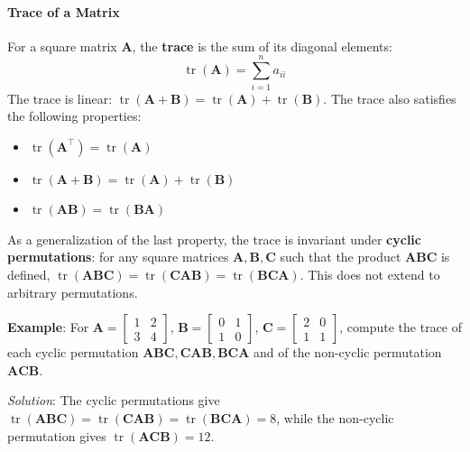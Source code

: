 \paragraph*{Trace of a Matrix}
For a square matrix $ \mathbf{A} $, the \textbf{trace} is the sum of its diagonal elements:
\begin{equation*}
    \operatorname{tr}(\mathbf{A}) = \sum_{i=1}^n a_{ii}
\end{equation*}
The trace is linear: $ \operatorname{tr}(\mathbf{A} + \mathbf{B}) = \operatorname{tr}(\mathbf{A}) + \operatorname{tr}(\mathbf{B}) $.
The trace also satisfies the following properties:
\begin{itemize}
\item $ \operatorname{tr}(\mathbf{A}^\top) = \operatorname{tr}(\mathbf{A}) $
\item $ \operatorname{tr}(\mathbf{A} + \mathbf{B}) = \operatorname{tr}(\mathbf{A}) + \operatorname{tr}(\mathbf{B}) $
\item $ \operatorname{tr}(\mathbf{AB}) = \operatorname{tr}(\mathbf{BA}) $
\end{itemize}

As a generalization of the last property, the trace is invariant under \textbf{cyclic permutations}: for any square matrices $ \mathbf{A}, \mathbf{B}, \mathbf{C} $ such that the product $ \mathbf{ABC} $ is defined, $ \operatorname{tr}(\mathbf{ABC}) = \operatorname{tr}(\mathbf{CAB}) = \operatorname{tr}(\mathbf{BCA}) $. This does not extend to arbitrary permutations.

\begin{exampleBox}
    \textbf{Example}: For
    $ \mathbf{A} = \begin{bmatrix} 1 & 2 \\ 3 & 4 \end{bmatrix} $,
    $ \mathbf{B} = \begin{bmatrix} 0 & 1 \\ 1 & 0 \end{bmatrix} $,
    $ \mathbf{C} = \begin{bmatrix} 2 & 0 \\ 1 & 1 \end{bmatrix} $,
    compute the trace of each cyclic permutation $ \mathbf{ABC}, \mathbf{CAB}, \mathbf{BCA} $ and of the non-cyclic permutation $ \mathbf{ACB} $.

    \emph{Solution}: The cyclic permutations give $ \operatorname{tr}(\mathbf{ABC}) = \operatorname{tr}(\mathbf{CAB}) = \operatorname{tr}(\mathbf{BCA}) = 8 $, while the non-cyclic permutation gives $ \operatorname{tr}(\mathbf{ACB}) = 12 $.
\end{exampleBox}

